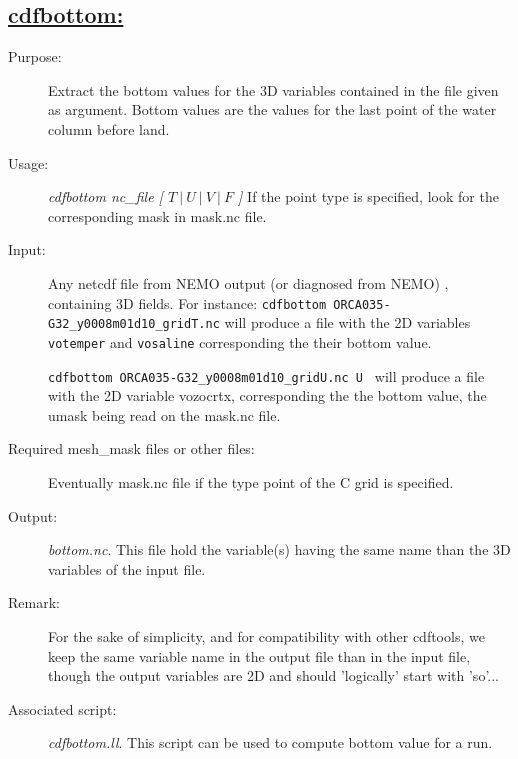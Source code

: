 \documentclass[a4paper,11pt]{article}
\begin{document}
\newpage
\subsection*{\underline{cdfbottom:}}
\begin{description}
\item[Purpose:] Extract the bottom values for the 3D variables contained in the file given as argument. Bottom
values are the values for the last point of the water column before land.
\item[Usage:] {\em cdfbottom nc\_file [ $T~|~U~|~V~|~F$ ] }
If the point type is specified, look for the corresponding mask in mask.nc file.
\item[Input:] Any netcdf file from NEMO output (or diagnosed from NEMO) , containing 3D fields.
For instance: {\tt cdfbottom  ORCA035-G32\_y0008m01d10\_gridT.nc}
will produce a file with the 2D variables {\tt votemper} and {\tt vosaline} corresponding the their bottom value.

{\tt cdfbottom  ORCA035-G32\_y0008m01d10\_gridU.nc U } will produce a file with the 2D variable vozocrtx, corresponding the the
bottom value, the umask being read on the mask.nc file. 
\item[Required mesh\_mask files or other files:]  Eventually mask.nc file if the type point of the C grid is specified.
\item[Output:] {\em bottom.nc}. This file hold the variable(s) having the same name than the 3D variables of the input file.
\item[Remark:] For the sake of simplicity, and for compatibility with other cdftools, we keep the same variable name in the
output file than in the input file, though the output variables are 2D and should 'logically' start with 'so'... 
\item[Associated script:] {\em cdfbottom.ll}. This script can be used to compute bottom value for a run.
\end{description}

\newpage
\end{document}

